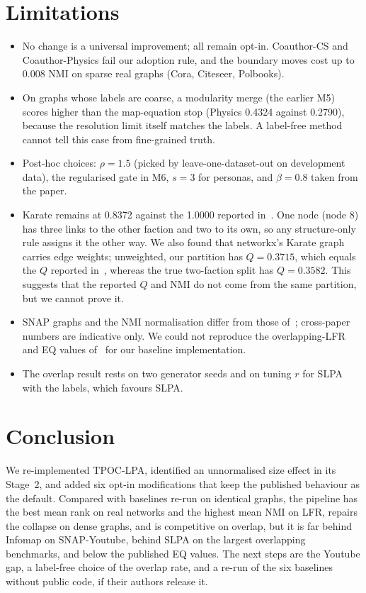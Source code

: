 \documentclass[conference]{IEEEtran}
\begin{document}
\section{Limitations}\label{sec:limits}
\begin{itemize}
\item No change is a universal improvement; all remain opt-in. Coauthor-CS and Coauthor-Physics fail our adoption rule, and the boundary moves cost up to 0.008 NMI on sparse real graphs (Cora, Citeseer, Polbooks).
\item On graphs whose labels are coarse, a modularity merge (the earlier M5) scores higher than the map-equation stop (Physics 0.4324 against 0.2790), because the resolution limit itself matches the labels. A label-free method cannot tell this case from fine-grained truth.
\item Post-hoc choices: $\rho{=}1.5$ (picked by leave-one-dataset-out on development data), the regularised gate in M6, $s{=}3$ for personas, and $\beta{=}0.8$ taken from the paper.
\item Karate remains at 0.8372 against the 1.0000 reported in~\cite{kong2026}. One node (node 8) has three links to the other faction and two to its own, so any structure-only rule assigns it the other way. We also found that networkx's Karate graph carries edge weights; unweighted, our partition has $Q=0.3715$, which equals the $Q$ reported in~\cite{kong2026}, whereas the true two-faction split has $Q=0.3582$. This suggests that the reported $Q$ and NMI do not come from the same partition, but we cannot prove it.
\item SNAP graphs and the NMI normalisation differ from those of~\cite{kong2026}; cross-paper numbers are indicative only. We could not reproduce the overlapping-LFR and EQ values of~\cite{kong2026} for our baseline implementation.
\item The overlap result rests on two generator seeds and on tuning $r$ for SLPA with the labels, which favours SLPA.
\end{itemize}

\section{Conclusion}
We re-implemented TPOC-LPA, identified an unnormalised size effect in its Stage~2, and added six opt-in modifications that keep the published behaviour as the default. Compared with baselines re-run on identical graphs, the pipeline has the best mean rank on real networks and the highest mean NMI on LFR, repairs the collapse on dense graphs, and is competitive on overlap, but it is far behind Infomap on SNAP-Youtube, behind SLPA on the largest overlapping benchmarks, and below the published EQ values. The next steps are the Youtube gap, a label-free choice of the overlap rate, and a re-run of the six baselines without public code, if their authors release it.
\end{document}
